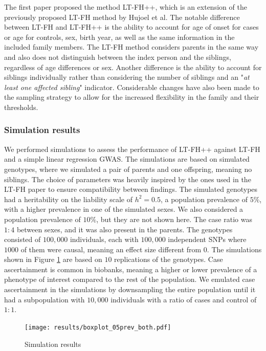 The first paper proposed the method LT-FH++, which is an extension of the previously proposed LT-FH method by Hujoel et al\cite{hujoel2020liability}. The notable difference between LT-FH and LT-FH++ is the ability to account for age of onset for cases or age for controls, sex, birth year, as well as the same information in the included family members. The LT-FH method considers parents in the same way and also does not distinguish between the index person and the siblings, regardless of age differences or sex. Another difference is the ability to account for siblings individually rather than considering the number of siblings and an "\textit{at least one affected sibling}" indicator. Considerable changes have also been made to the sampling strategy to allow for the increased flexibility in the family and their thresholds. 

\subsubsection{Simulation results}
We performed simulations to assess the performance of LT-FH++ against LT-FH and a simple linear regression GWAS. The simulations are based on simulated genotypes, where we simulated a pair of parents and one offspring, meaning no siblings. The choice of parameters was heavily inspired by the ones used in the LT-FH paper to ensure compatibility between findings. The simulated genotypes had a heritability on the liability scale of $ h^2 = 0.5 $, a population prevalence of $ 5\% $, with a higher prevalence in one of the simulated sexes. We also considered a population prevalence of $ 10\% $, but they are not shown here. The case ratio was $ 1:4 $ between sexes, and it was also present in the parents. The genotypes consisted of $ 100,000 $ individuals, each with $ 100,000 $ independent SNPs where $ 1000 $ of them were causal, meaning an effect size different from $ 0 $. The simulations shown in Figure \ref{fig:LTFH++_simulation_results} are based on $ 10 $ replications of the genotypes. Case ascertainment is common in biobanks, meaning a higher or lower prevalence of a phenotype of interest compared to the rest of the population. We emulated case ascertainment in the simulations by downsampling the entire population until it had a subpopulation with $ 10,000 $ individuals with a ratio of cases and control of $ 1:1 $.
\begin{figure}[h]
	\label{fig:LTFH++_simulation_results}
	\caption{Simulation results}
	\texttt{[image: results/boxplot\_05prev\_both.pdf]}
\end{figure}

